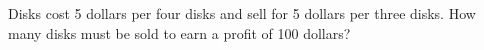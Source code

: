 Disks cost 5 dollars per four disks and sell for 5 dollars per three disks. How many disks must be sold to earn a profit of 100 dollars?
